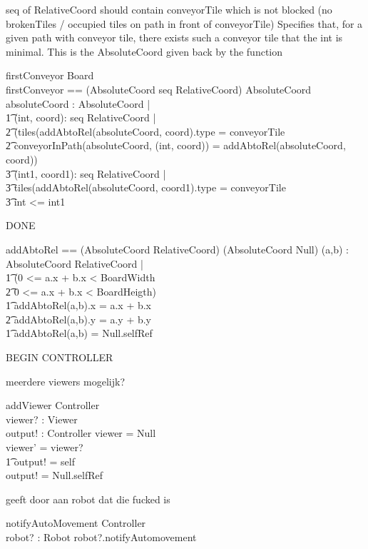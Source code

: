 \documentclass[a4paper,11pt]{article}
\begin{document}
seq of RelativeCoord should contain conveyorTile which is not blocked (no brokenTiles / occupied tiles on path in front of conveyorTile)
Specifies that, for a given path with conveyor tile, there exists such a conveyor tile that the int is minimal. This is the AbsoluteCoord given back by the function
\begin{schema}{firstConveyor}
\Xi Board \\
firstConveyor == (AbsoluteCoord \cross seq RelativeCoord) \rightarrow AbsoluteCoord
\where
\exists absoluteCoord : AbsoluteCoord |  \\ \t1
\exists (int, coord): seq RelativeCoord |  \\ \t2
(tiles(addAbtoRel(absoluteCoord, coord).type = conveyorTile \\ \t2
conveyorInPath(absoluteCoord, (int, coord)) = addAbtoRel(absoluteCoord, coord)) \implies \\ \t3
\forall (int1, coord1): seq RelativeCoord | \\ \t3
\IF tiles(addAbtoRel(absoluteCoord, coord1).type = conveyorTile \\ \t3
\THEN int <= int1
\end{schema}

DONE
\begin{axdef}
addAbtoRel == (AbsoluteCoord \cross RelativeCoord) \rightarrow (AbsoluteCoord \union Null)
\where
\forall (a,b) : AbsoluteCoord \cross RelativeCoord | \\ \t1
\IF (0 <= a.x + b.x < BoardWidth \\ \t2
0 <= a.x + b.x < BoardHeigth) \\ \t1
\THEN
addAbtoRel(a,b).x = a.x + b.x \\ \t2
addAbtoRel(a,b).y = a.y + b.y \\ \t1
\ELSE addAbtoRel(a,b) = Null.selfRef
\end{axdef}


BEGIN CONTROLLER

meerdere viewers mogelijk?
\begin{schema}{addViewer}
\Delta Controller \\
viewer? : Viewer \\
output! : Controller 
\where
\IF viewer = Null \\
\THEN viewer' = viewer? \\ \t1
output! = self \\
\ELSE output! = Null.selfRef
\end{schema}


geeft door aan robot dat die fucked is
\begin{schema}{notifyAutoMovement}
\Xi Controller \\
robot? : Robot
\where
robot?.notifyAutomovement
\end{schema}
\end{document}
